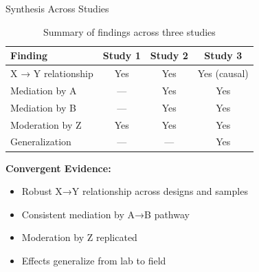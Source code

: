 \documentclass[aspectratio=169,12pt]{beamer}
\begin{document}
\begin{frame}{Synthesis Across Studies}
  \begin{table}
    \centering
    \caption{Summary of findings across three studies}
    \small
    \begin{tabular}{lccc}
      \toprule
      \textbf{Finding} & \textbf{Study 1} & \textbf{Study 2} & \textbf{Study 3} \\
      \midrule
      X → Y relationship & Yes & Yes & Yes (causal) \\
      Mediation by A & --- & Yes & Yes \\
      Mediation by B & --- & Yes & Yes \\
      Moderation by Z & Yes & Yes & Yes \\
      Generalization & --- & --- & Yes \\
      \bottomrule
    \end{tabular}
  \end{table}
  
  \vspace{0.5cm}
  
  \textbf{Convergent Evidence:}
  \begin{itemize}
    \item Robust X→Y relationship across designs and samples
    \item Consistent mediation by A→B pathway
    \item Moderation by Z replicated
    \item Effects generalize from lab to field
  \end{itemize}
\end{frame}
\end{document}
